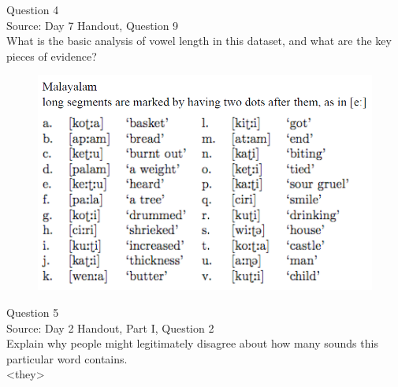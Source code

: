 \documentclass[12pt]{article}
\begin{document}
\newpage

{\large Question 4}\\

Source: Day 7 Handout, Question 9\\

What is the basic analysis of vowel length in this dataset, and what are the key pieces of evidence?\\

\begin{figure}[H]
\includegraphics{../images/malayalam.png}
\end{figure}

\newpage

{\large Question 5}\\

Source: Day 2 Handout, Part I, Question 2\\

Explain why people might legitimately disagree about how many sounds this particular word contains.\\

<they>


\newpage

\begin{center}
\textbf{{\color{red}{\HUGE END OF EXAM}}}\\

\end{center}
\newpage

\begin{center}
\textbf{{\color{blue}{\HUGE START OF EXAM\\}}}

\textbf{{\color{blue}{\HUGE Student ID: 8742\\}}}

\textbf{{\color{blue}{\HUGE 3:00 - 3:15 PM\\}}}

\end{center}
\newpage
\end{document}
